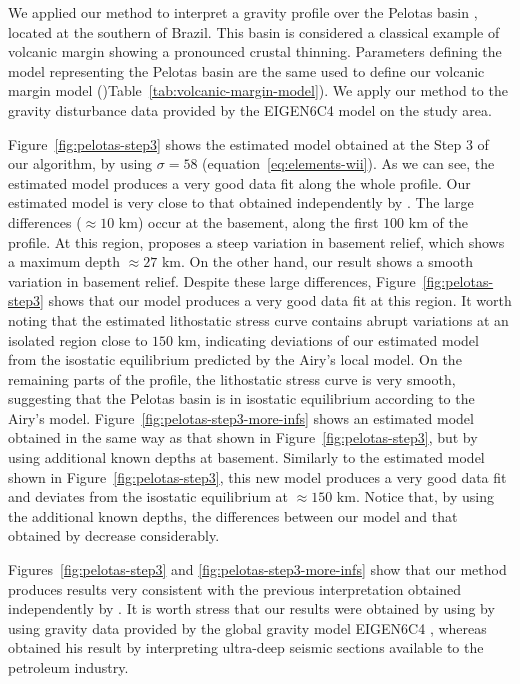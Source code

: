 \documentclass[manuscript]{geophysics}
\begin{document}
We applied our method to interpret a gravity profile over the Pelotas basin
\citep{stica-etal2014}, located at the southern of Brazil. This basin is 
considered a classical example of volcanic margin \citep{geoffroy2005} showing 
a pronounced crustal thinning.
Parameters defining the model representing the Pelotas basin are the same used
to define our volcanic margin model ()Table~\ref{tab:volcanic-margin-model}).
We apply our method to the gravity disturbance data provided by the EIGEN6C4
model \citep{forste2014} on the study area.

Figure~\ref{fig:pelotas-step3} shows the estimated model obtained at the Step 3
of our algorithm, by using $\sigma = 58$ (equation~\ref{eq:elements-wii}). 
As we can see, the estimated model produces a very good data fit along the whole
profile. Our estimated model is very close to that obtained independently by
\citet{zalan2015}.
The large differences ($\approx 10$ km) occur at the basement, along the first 
$100$ km of the profile.
At this region, \citeauthor{zalan2015} proposes a steep variation in basement
relief, which shows a maximum depth $\approx 27$ km. On the other hand, our result 
shows a smooth variation in basement relief. Despite these large differences,
Figure~\ref{fig:pelotas-step3} shows that our model produces a very good data fit
at this region.
It worth noting that the estimated lithostatic stress curve contains abrupt variations
at an isolated region close to $150$ km, indicating deviations of our estimated model
from the isostatic equilibrium predicted by the Airy's local model.
On the remaining parts of the profile, the lithostatic stress curve is very smooth,
suggesting that the Pelotas basin is in isostatic equilibrium according to the
Airy's model.
Figure~\ref{fig:pelotas-step3-more-infs} shows an estimated model
obtained in the same way as that shown in Figure~\ref{fig:pelotas-step3},
but by using additional known depths at basement.
Similarly to the estimated model shown in Figure~\ref{fig:pelotas-step3},
this new model produces a very good data fit and deviates from the
isostatic equilibrium at $\approx 150$ km. 
Notice that, by using the additional known depths, the differences between our model
and that obtained by \citet{zalan2015} decrease considerably.

Figures~\ref{fig:pelotas-step3} and \ref{fig:pelotas-step3-more-infs} show that our
method produces results very consistent with the
previous interpretation obtained independently by \citet{zalan2015}.
It is worth stress that our results were obtained by using by using gravity data
provided by the global gravity model EIGEN6C4 \citep{forste2014}, whereas 
\citet{zalan2015} obtained his result by interpreting ultra-deep seismic sections
available to the petroleum industry.
\end{document}
